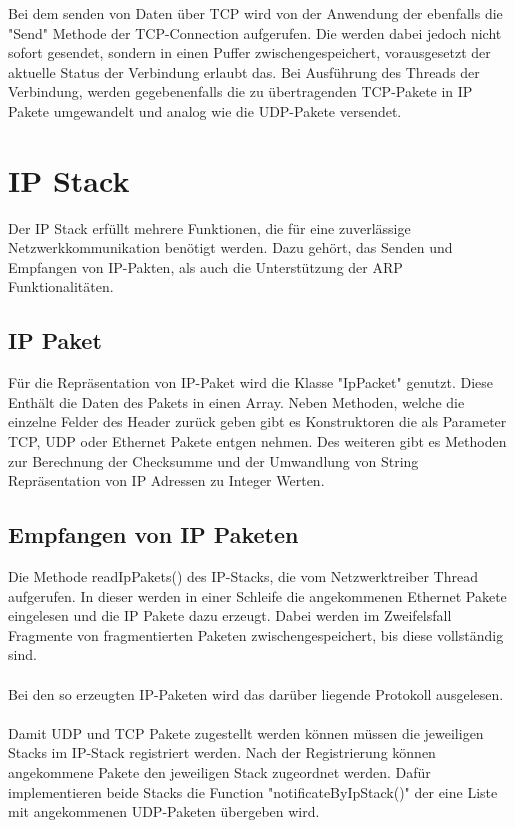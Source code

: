 Bei dem senden von Daten über TCP wird von der Anwendung der ebenfalls die {}"Send"{} Methode der TCP-Connection aufgerufen. Die werden dabei jedoch nicht sofort gesendet, sondern in einen Puffer zwischengespeichert, vorausgesetzt der aktuelle Status der Verbindung erlaubt das. Bei Ausführung des Threads der Verbindung, werden gegebenenfalls die zu übertragenden TCP-Pakete in IP Pakete umgewandelt und analog wie die UDP-Pakete versendet. 



\section{IP Stack}
Der IP Stack erfüllt mehrere Funktionen, die für eine zuverlässige Netzwerkkommunikation benötigt werden. Dazu gehört, das Senden und Empfangen von IP-Pakten, als auch die Unterstützung der ARP Funktionalitäten.

\subsection{IP Paket}
Für die Repräsentation von IP-Paket wird die Klasse "IpPacket" genutzt. Diese Enthält die Daten des Pakets in einen Array. Neben Methoden, welche die einzelne Felder des Header zurück geben gibt es Konstruktoren die als Parameter TCP, UDP oder Ethernet Pakete entgen nehmen. Des  weiteren gibt es Methoden zur Berechnung der Checksumme und der Umwandlung von String Repräsentation von IP Adressen zu Integer Werten.  

\subsection{Empfangen von IP Paketen}

Die Methode readIpPakets() des IP-Stacks, die vom Netzwerktreiber Thread aufgerufen. In dieser werden in einer Schleife die angekommenen Ethernet Pakete eingelesen und die IP Pakete dazu erzeugt. Dabei werden im Zweifelsfall Fragmente von fragmentierten Paketen zwischengespeichert, bis diese vollständig sind. \\\\
Bei den so erzeugten IP-Paketen wird das darüber liegende Protokoll ausgelesen.\\\\
Damit UDP und TCP Pakete zugestellt werden können müssen die jeweiligen Stacks im IP-Stack registriert werden. Nach der Registrierung können angekommene  Pakete den jeweiligen Stack zugeordnet werden. Dafür implementieren beide Stacks die Function "notificateByIpStack()" der eine Liste mit angekommenen UDP-Paketen übergeben wird. 

